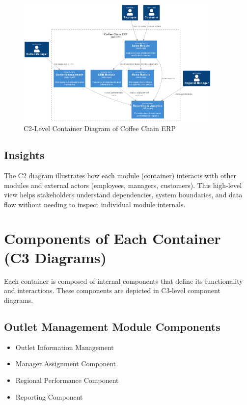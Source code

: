\begin{figure}[H]
\centering
\includegraphics[width=0.9\textwidth,keepaspectratio]{diagrams/C2.png}
\caption{C2-Level Container Diagram of Coffee Chain ERP}
\end{figure}

\subsection*{Insights}

The C2 diagram illustrates how each module (container) interacts with other modules and external actors (employees, managers, customers). This high-level view helps stakeholders understand dependencies, system boundaries, and data flow without needing to inspect individual module internals.

\section*{Components of Each Container (C3 Diagrams)}

Each container is composed of internal components that define its functionality and interactions. These components are depicted in C3-level component diagrams.

\subsection*{Outlet Management Module Components}
\begin{itemize}
    \item Outlet Information Management
    \item Manager Assignment Component
    \item Regional Performance Component
    \item Reporting Component
\end{itemize}

